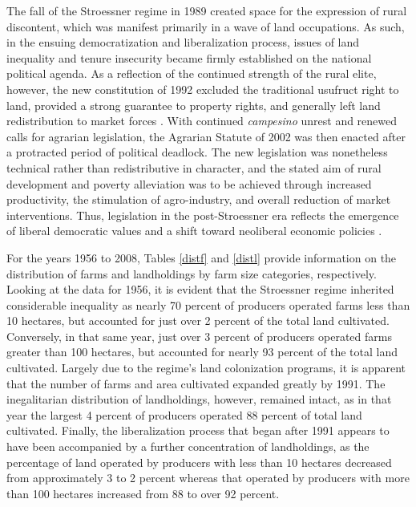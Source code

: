 \documentclass[english]{article}
\begin{document}
The fall of the Stroessner regime in 1989 created space for the expression of 
rural discontent, which was manifest primarily in a wave of land occupations.
As such, in the ensuing democratization and liberalization process, issues of  
land inequality and tenure insecurity became firmly established on the national 
political agenda.
As a reflection of the continued strength of the rural elite, however, the new 
constitution of 1992 excluded the traditional usufruct right to land, provided a 
strong guarantee to property rights, and generally left land redistribution to 
market forces \citep{nagel1999, danielsen2009}.
With continued \emph{campesino} unrest and renewed calls for agrarian 
legislation, the Agrarian Statute of 2002 was then enacted after a protracted 
period of political deadlock.
The new legislation was nonetheless technical rather than redistributive in 
character, and the stated aim of rural development and poverty alleviation 
was to be achieved through increased productivity, the stimulation of
agro-industry, and overall reduction of market interventions.
Thus, legislation in the post-Stroessner era reflects the emergence of liberal 
democratic values and a shift toward neoliberal economic policies
\citep{danielsen2009}. 

For the years 1956 to 2008, Tables \ref{distf} and \ref{distl} provide 
information on the distribution of farms and landholdings by farm size 
categories, respectively. 
Looking at the data for 1956, it is evident that the Stroessner regime 
inherited considerable inequality as nearly 70 percent of producers 
operated farms less than 10 hectares, but accounted for just over 2 percent 
of the total land cultivated.
Conversely, in that same year, just over 3 percent of producers operated
farms greater than 100 hectares, but accounted for nearly 93 percent
of the total land cultivated.
Largely due to the regime's land colonization programs, it is apparent that 
the number of farms and area cultivated expanded greatly by 1991. 
The inegalitarian distribution of landholdings, however, remained intact, as in 
that year the largest 4 percent of producers operated 88 percent of total 
land cultivated.
Finally, the liberalization process that began after 1991 appears to have been
accompanied by a further concentration of landholdings, as the percentage of 
land operated by producers with less than 10 hectares decreased from 
approximately 3 to 2 percent whereas that operated by producers with more 
than 100 hectares increased from 88 to over 92 percent.
\end{document}
